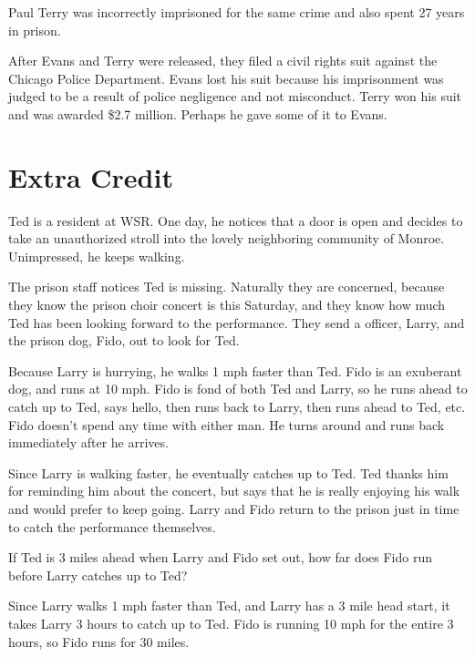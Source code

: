 \documentclass[letterpaper]{exam}
\begin{document}
\begin{questions}
\begin{parts}
\begin{solution}
            Paul Terry was incorrectly imprisoned for the same crime and also
            spent 27 years in prison.  

            After Evans and Terry were released, they filed a civil rights
            suit against the Chicago Police Department.  Evans lost his suit
            because his imprisonment was judged to be a result of police
            negligence and not misconduct.  Terry won his suit and was awarded
            \$2.7 million.  Perhaps he gave some of it to Evans.

          \end{solution}

      \end{parts}

    \ifprintanswers{}
    \else
      \pagebreak
    \fi

    \section{Extra Credit}

    \question{}

    Ted is a resident at WSR\@.  One day, he notices that a door is open and
    decides to take an unauthorized stroll into the lovely neighboring
    community of Monroe.  Unimpressed, he keeps walking.

    The prison staff notices Ted is missing.  Naturally they are concerned,
    because they know the prison choir concert is this Saturday, and they know
    how much Ted has been looking forward to the performance.  They send a
    officer, Larry, and the prison dog, Fido, out to look for Ted.

    Because Larry is hurrying, he walks 1 mph faster than Ted.  Fido is an
    exuberant dog, and runs at 10 mph.  Fido is fond of both Ted and Larry, so
    he runs ahead to catch up to Ted, says hello, then runs back to Larry, then
    runs ahead to Ted, etc.  Fido doesn't spend any time with either man.  He
    turns around and runs back immediately after he arrives.

    Since Larry is walking faster, he eventually catches up to Ted.  Ted
    thanks him for reminding him about the concert, but says that he is really
    enjoying his walk and would prefer to keep going.  Larry and Fido return
    to the prison just in time to catch the performance themselves.

    If Ted is 3 miles ahead when Larry and Fido set out, how far does Fido run
    before Larry catches up to Ted?

    \begin{solution}
      Since Larry walks 1 mph faster than Ted, and Larry has a 3 mile head
      start, it takes Larry 3 hours to catch up to Ted.  Fido is running 10 mph
      for the entire 3 hours, so Fido runs for 30 miles.
    \end{solution}

  \end{questions}
  \ifprintanswers{}
\end{document}
